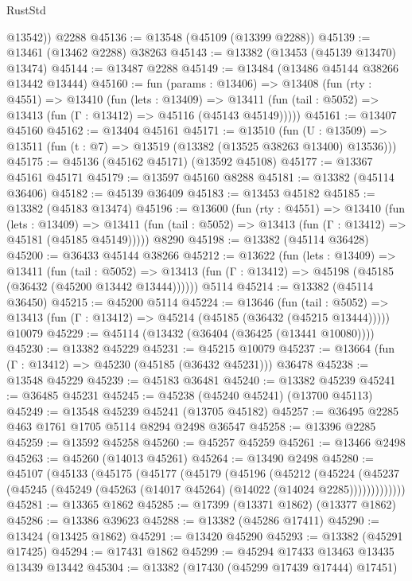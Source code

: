 \begin{lexlean}{RustStd}
\begin{coremodule}
        @13542))
    @2288
@45136 := @13548 (@45109 (@13399 @2288))
@45139 := @13461 (@13462 @2288) @38263
@45143 := @13382 (@13453 (@45139 @13470) @13474)
@45144 := @13487 @2288
@45149 := @13484 (@13486 @45144 @38266 @13442 @13444)
@45160 := fun (params : @13406) =>
  @13408
    (fun (rty : @4551) =>
    @13410
      (fun (lets : @13409) =>
      @13411 (fun (tail : @5052) => @13413 (fun (Γ : @13412) => @45116 (@45143 @45149)))))
@45161 := @13407 @45160
@45162 := @13404 @45161
@45171 := @13510
    (fun (U : @13509) => @13511 (fun (t : @7) => @13519 (@13382 (@13525 @38263 @13400) @13536)))
@45175 := @45136 (@45162 @45171) (@13592 @45108)
@45177 := @13367 @45161 @45171
@45179 := @13597 @45160 @8288
@45181 := @13382 (@45114 @36406)
@45182 := @45139 @36409
@45183 := @13453 @45182
@45185 := @13382 (@45183 @13474)
@45196 := @13600
    (fun (rty : @4551) =>
    @13410
      (fun (lets : @13409) =>
      @13411 (fun (tail : @5052) => @13413 (fun (Γ : @13412) => @45181 (@45185 @45149)))))
    @8290
@45198 := @13382 (@45114 @36428)
@45200 := @36433 @45144 @38266
@45212 := @13622
    (fun (lets : @13409) =>
    @13411
      (fun (tail : @5052) =>
      @13413 (fun (Γ : @13412) => @45198 (@45185 (@36432 (@45200 @13442 @13444))))))
    @5114
@45214 := @13382 (@45114 @36450)
@45215 := @45200 @5114
@45224 := @13646
    (fun (tail : @5052) => @13413 (fun (Γ : @13412) => @45214 (@45185 (@36432 (@45215 @13444)))))
    @10079
@45229 := @45114 (@13432 (@36404 (@36425 (@13441 @10080))))
@45230 := @13382 @45229
@45231 := @45215 @10079
@45237 := @13664 (fun (Γ : @13412) => @45230 (@45185 (@36432 @45231))) @36478
@45238 := @13548 @45229
@45239 := @45183 @36481
@45240 := @13382 @45239
@45241 := @36485 @45231
@45245 := @45238 (@45240 @45241) (@13700 @45113)
@45249 := @13548 @45239 @45241 (@13705 @45182)
@45257 := @36495 @2285 @463 @1761 @1705 @5114 @8294 @2498 @36547
@45258 := @13396 @2285
@45259 := @13592 @45258
@45260 := @45257 @45259
@45261 := @13466 @2498
@45263 := @45260 (@14013 @45261)
@45264 := @13490 @2498
@45280 := @45107
    (@45133
      (@45175
        (@45177
          (@45179
            (@45196
              (@45212
                (@45224
                  (@45237 (@45245 (@45249 (@45263 (@14017 @45264) (@14022 (@14024 @2285)))))))))))))
@45281 := @13365 @1862
@45285 := @17399 (@13371 @1862) (@13377 @1862)
@45286 := @13386 @39623
@45288 := @13382 (@45286 @17411)
@45290 := @13424 (@13425 @1862)
@45291 := @13420 @45290
@45293 := @13382 (@45291 @17425)
@45294 := @17431 @1862
@45299 := @45294 @17433 @13463 @13435 @13439 @13442
@45304 := @13382 (@17430 (@45299 @17439 @17444) @17451)

\end{coremodule}
\end{lexlean}

